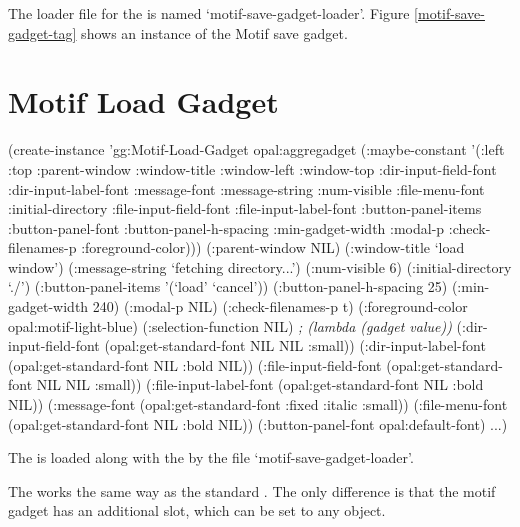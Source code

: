 The loader file for the  is named
`motif-save-gadget-loader'.  Figure \ref{motif-save-gadget-tag} shows an
instance of the Motif save gadget.





\section{Motif Load Gadget}
\label{motif-load-gadget}
\begin{programexample}
(create-instance 'gg:Motif-Load-Gadget opal:aggregadget
  (:maybe-constant '(:left :top :parent-window :window-title :window-left
		     :window-top :dir-input-field-font :dir-input-label-font
		     :message-font :message-string :num-visible :file-menu-font
		     :initial-directory :file-input-field-font
		     :file-input-label-font :button-panel-items :button-panel-font
		     :button-panel-h-spacing :min-gadget-width :modal-p
		     :check-filenames-p :foreground-color)))
  (:parent-window NIL)
  (:window-title `load window')
  (:message-string `fetching directory...')
  (:num-visible 6)
  (:initial-directory `./')
  (:button-panel-items '(`load' `cancel'))
  (:button-panel-h-spacing 25)
  (:min-gadget-width 240)
  (:modal-p NIL)
  (:check-filenames-p t)
  (:foreground-color opal:motif-light-blue)
  (:selection-function NIL)   {\it ; (lambda (gadget value))}
  (:dir-input-field-font (opal:get-standard-font NIL NIL :small))
  (:dir-input-label-font (opal:get-standard-font NIL :bold NIL))
  (:file-input-field-font (opal:get-standard-font NIL NIL :small))
  (:file-input-label-font (opal:get-standard-font NIL :bold NIL))
  (:message-font (opal:get-standard-font :fixed :italic :small))
  (:file-menu-font (opal:get-standard-font NIL :bold NIL))
  (:button-panel-font opal:default-font)
  ...)

\end{programexample}

The  is loaded along with the 
by the file `motif-save-gadget-loader'.

The  works the same way as the standard .
The only difference is that the motif gadget has an additional
 slot, which can be set to any  object.



